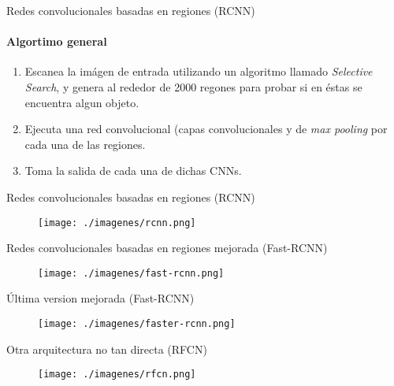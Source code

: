 \documentclass[presentation, t]{beamer}
\begin{document}
\begin{frame}[label={sec:org2ad81c0}]{Redes convolucionales basadas en regiones (RCNN)}
\framesubtitle{Algortimo general}

\begin{enumerate}
\item Escanea la imágen de entrada utilizando un algoritmo llamado \emph{Selective Search},
y genera al rededor de 2000 regones para probar si en éstas se encuentra algun objeto.

\item Ejecuta una red convolucional (capas convolucionales y de \emph{max pooling} por cada una de las regiones.

\item Toma la salida de cada una de dichas CNNs.
\end{enumerate}
\end{frame}


\begin{frame}[label={sec:org66818a0}]{Redes convolucionales basadas en regiones (RCNN)}
\vfill
\begin{figure}[htbp]
\centering
\texttt{[image: ./imagenes/rcnn.png]}
\end{figure}\vfill
\end{frame}


\begin{frame}[label={sec:orgb7b11da}]{Redes convolucionales basadas en regiones mejorada (Fast-RCNN)}
\vfill

\begin{figure}[htbp]
\centering
\texttt{[image: ./imagenes/fast-rcnn.png]}
\end{figure}\vfill
\end{frame}

\begin{frame}[label={sec:org95e241e}]{Última version mejorada (Fast-RCNN)}
\vfill

\begin{figure}[htbp]
\centering
\texttt{[image: ./imagenes/faster-rcnn.png]}
\end{figure}\vfill
\end{frame}

\begin{frame}[label={sec:orgf6447f9}]{Otra arquitectura no tan directa (RFCN)}
\vfill

\begin{figure}[htbp]
\centering
\texttt{[image: ./imagenes/rfcn.png]}
\end{figure}\vfill
\end{frame}
\end{document}
